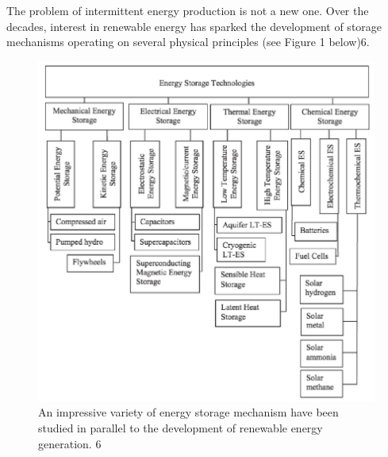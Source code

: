 The problem of intermittent energy production is not a new one. Over the
decades, interest in renewable energy has sparked the development of storage
mechanisms operating on several physical principles (see Figure 1 below)\cite{patrick}{6}.

\begin{figure}
\begin{center}
\includegraphics[scale=0.6]{pics/PatrickFigure1.png}
\caption{An impressive variety of energy storage mechanism have been studied in
parallel to the development of renewable energy generation. \cite{patrick}{6}}
\label{p1}
\end{center}
\end{figure}

